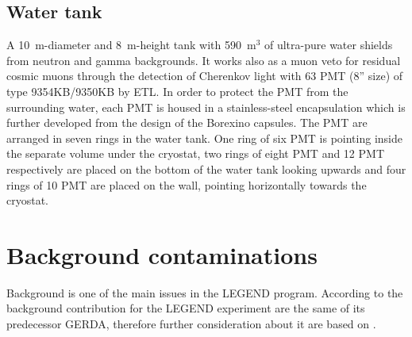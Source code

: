 \subsection{Water tank}
A 10~m-diameter and 8~m-height tank with 590~m$^3$ of ultra-pure water shields from neutron and gamma backgrounds. It works also as a muon veto for residual cosmic muons through the detection of Cherenkov light with 63 \ac{PMT} (8” size) of type 9354KB/9350KB by ETL. In order
to protect the \ac{PMT} from the surrounding water, each PMT is housed in a stainless-steel encapsulation which is further developed from the design of the Borexino capsules. The \ac{PMT} are arranged in seven rings in the water tank. One ring of six \ac{PMT} is pointing inside the separate volume under the cryostat,  two rings of eight \ac{PMT} and 12 \ac{PMT}  respectively are placed on the bottom of the water tank looking upwards and four rings of 10 \ac{PMT} are placed on the wall, pointing horizontally towards the cryostat. \cite{GERDA-muonVeto} 

\section{Background contaminations}
\label{sec:background}
Background is one of the main issues in the LEGEND program. According to \cite{L200-sep25} the background contribution for the LEGEND experiment are the same of its predecessor GERDA, therefore further consideration about it are based on \cite{GERDAphase2}.


